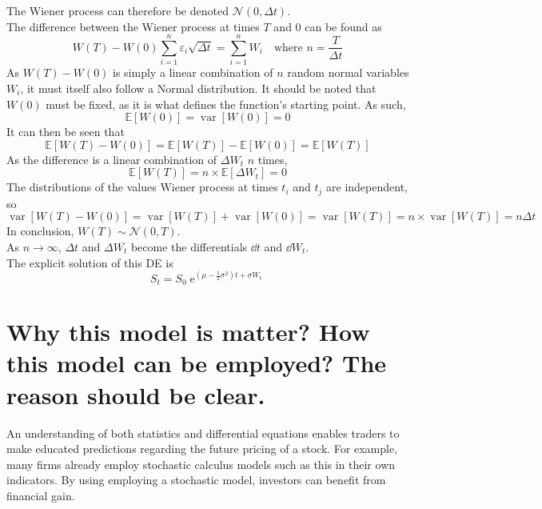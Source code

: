 \documentclass[12pt, A4]{article}
\DeclareMathOperator{\en}{e}
\newcommand{\Exp}{\mathbb{E}}
\newcommand{\ndist}{\mathcal{N}}
\DeclareMathOperator{\vari}{var}
\begin{document}
				The Wiener process can therefore be denoted \(\ndist(0, \Delta t)\). \\
			The difference between the Wiener process at times \(T\) and 0 can be found as
				\[W(T) - W(0) \sum_{i = 1}^n \varepsilon_i\sqrt{\Delta t} = \sum_{i = 1}^n W_i \quad \text{where } n = \frac{T}{\Delta t} \]
				As \(W(T) - W(0)\) is simply a linear combination of \(n\) random normal variables \(W_i\), it must itself also follow a Normal distribution. It should be noted that \(W(0)\) must be fixed, as it is what defines the function's starting point. As such,
				\[\Exp[W(0)] = \vari[W(0)] = 0\]
		 		It can then be seen that
		 		\[\Exp[W(T) - W(0)] = \Exp[W(T)] - \Exp[W(0)] = \Exp[W(T)]\]
		 		As the difference is a linear combination of \(\Delta W_t\) \(n\) times,
		 			\[\Exp[W(T)] = n \times \Exp[\Delta W_t] = 0\]
		 		The distributions of the values Wiener process at times \(t_i\) and \(t_j\) are independent, so
		 			\[\vari[W(T) - W(0)] = \vari[W(T)] + \vari[W(0)] = \vari[W(T)] = n \times \vari[W(T)] = n\Delta t\]
		 		In conclusion, \(W(T) \sim \ndist(0, T)\). \\
			 As \(n \to \infty\), \(\Delta t\) and \(\Delta W_t\) become the differentials \(\dd{t}\) and \(\dd{W_t}\). \\
			 The explicit solution of this DE is
			 	\[S_t = S_0\en^{\left(\mu - \frac{1}{2}\sigma^2\right)t + \sigma W_t}\]
		\section{Why this model is matter? How this model can be employed? The reason should be clear.}
			An understanding of both statistics and differential equations enables traders to make educated predictions regarding the future pricing of a stock. For example, many firms already employ stochastic calculus models such as this in their own indicators. By using employing a stochastic model, investors can benefit from financial gain. 
\end{document}
